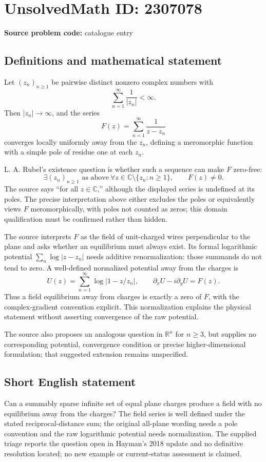 \documentclass[11pt]{article}
\newcommand{\R}{\mathbb{R}}
\newcommand{\C}{\mathbb{C}}
\begin{document}
\section*{UnsolvedMath ID: 2307078}
\textbf{Source problem code:} catalogue entry
\subsection{Definitions and mathematical statement}
Let $(z_n)_{n\geq1}$ be pairwise distinct nonzero complex numbers with
\[
 \sum_{n=1}^{\infty}\frac1{|z_n|}<\infty.
\]
Then $|z_n|\to\infty$, and the series
\[
 F(z)=\sum_{n=1}^{\infty}\frac1{z-z_n}
\]
converges locally uniformly away from the $z_n$, defining a meromorphic function with a simple pole of residue one at each $z_n$.

L. A. Rubel's existence question is whether such a sequence can make $F$ zero-free:
\[
 \exists(z_n)_{n\geq1}\text{ as above}\ \forall z\in\C\setminus\{z_n:n\geq1\},
 \qquad F(z)\ne0.
\]
The source says ``for all $z\in\C$,'' although the displayed series is undefined at its poles. The precise interpretation above either excludes the poles or equivalently views $F$ meromorphically, with poles not counted as zeros; this domain qualification must be confirmed rather than hidden.

The source interprets $F$ as the field of unit-charged wires perpendicular to the plane and asks whether an equilibrium must always exist. Its formal logarithmic potential $\sum_n\log|z-z_n|$ needs additive renormalization: those summands do not tend to zero. A well-defined normalized potential away from the charges is
\[
 U(z)=\sum_{n=1}^{\infty}\log|1-z/z_n|,
 \qquad \partial_xU-i\partial_yU=F(z).
\]
Thus a field equilibrium away from charges is exactly a zero of $F$, with the complex-gradient convention explicit. This normalization explains the physical statement without asserting convergence of the raw potential.

The source also proposes an analogous question in $\R^n$ for $n\geq3$, but supplies no corresponding potential, convergence condition or precise higher-dimensional formulation; that suggested extension remains unspecified.
\subsection{Short English statement}
Can a summably sparse infinite set of equal plane charges produce a field with no equilibrium away from the charges? The field series is well defined under the stated reciprocal-distance sum; the original all-plane wording needs a pole convention and the raw logarithmic potential needs normalization. The supplied triage reports the question open in Hayman's 2018 update and no definitive resolution located; no new example or current-status assessment is claimed.
\end{document}
